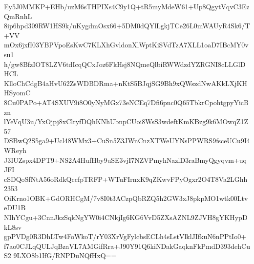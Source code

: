 Ey5J0MMKP+EHb/uzM6sTHPIXs4C9y1Q+tR5myMdeW61+Up8QgytVqvC3EzQmRnhL
8ip6hpd309RW1HS9k/uKygdmOsx66+5DM0dQYlLgkjTCe26L0mWAUyR4Sk6/T+VV
mOx6jxfI03YBPVpoEsKwC7KLXhGvldonXlWptKiSVdTzA7XLL1oaD7IBcMY0vsu1
h/gw8BfzIOT8LZV6tdIcqQCxJoz6FkHsj8NQmeQlbiRWWdzdYZRGNI8cLLGlDHCL
KlloChCdgB4aHvU62ZsWDBDRma+nKtS5BJqjSG9Bh9xQWszdNwAKkLXjKHHSyomC
8Cu0PAPo+AT4SXUV9i8O0yNyMGx73eNCEq7Dfi6pnc0Q65TbkrCpohtgpyYicBzn
lYeVqU3u/YxOjpj8xClryfDQhKNhUbnpCUoi8WsS3wdeftKmKBzg9k6MOwqZ1Z57
DSBwQ2S5ga9+Ucl48WMx3+CuSn5Z3JWnCnzXTWeUYNsPPWRS9fsceUCu9I4WReyh
J3IUZspx4DPT9+NS2A4HufHby9uSE3vjI7NZVPmyhNazlD3raBmyQgyqvm+uqJFI
cSDQoSfNtA56oRdkQccfpTRFP+WTuFIrnxK9qZKwvFPyOgxr2O4T8Va2LGhh2353
OiKrno1OBK+GdORHCgM/7v8I0t3ACzpQbRZQ5h2GW3xJ8pkpMO1wtk00LtveDU1B
NIhYCgu+3CnnJkzSqkNgYW0i4CNkjIg6KG6VvD5ZXsAZNL9ZJVH8gYKHypDkL8sv
gpPVDg0R3DhLTw4FoWkoT/rY03XrVgFylcbsECLh4sLstVlklJIfkuN6nPPtIo0+
f7ao0CJLqQULJqBzaVL7AMGifRra+J90Y91Q6kiNDakGaqknFkPmdD393dehCuS2
9LXO8b1IfG/RNPDuNQfHxQ==
